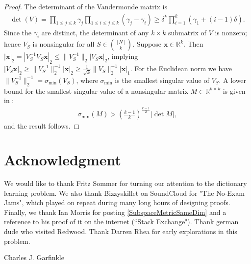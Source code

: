 \documentclass[journal, onecolumn]{IEEEtran}
\begin{document}
\begin{proof} 
The determinant of the Vandermonde matrix is
\begin{align}
	\det(V) = \prod_{1 \leq j \leq k} \gamma_j \prod_{1 \leq i \leq j \leq k} (\gamma_j - \gamma_i) \geq \delta^k \prod_{i = 1}^k (\gamma_1 + (i-1)\delta).
\end{align}	
Since the $\gamma_i$ are distinct, the determinant of any $k \times k$ submatrix of $V$ is nonzero; hence $V_S$ is nonsingular for all $S \in {[N] \choose k}$. Suppose $\mathbf{x} \in \mathbb{R}^k$. Then $|\mathbf{x}|_2 = |V_S^{-1} V_S \mathbf{x}|_2 \leq \|V_S^{-1}\|_2 |V_S \mathbf{x}|_2$, implying $|V_S \mathbf{x}|_2 \geq \|V_S^{-1}\|_2^{-1}|\mathbf{x}|_2 \geq \frac{1}{\sqrt{k}} \|V_S\|_2^{-1}|\mathbf{x}|_1$. For the Euclidean norm we have $\|V_S^{-1}\|_2^{-1} = \sigma_{\min}(V_S)$, where $\sigma_{\min}$ is the smallest singular value of $V_S$. A lower bound for the smallest singular value of a nonsingular matrix $M \in \mathbb{R}^{k \times k}$ is given in \cite{hong1992lower}:
\begin{align}
	\sigma_{\min}(M) > \left( \frac{k-1}{k} \right)^\frac{k-1}{2} |\det M|,
\end{align}
%
and the result follows. 
\end{proof}


\section*{Acknowledgment}
We would like to thank Fritz Sommer for turning our attention to the dictionary learning problem. We also thank Bizzyskillet on SoundCloud for "The No-Exam Jams", which played on repeat during many long hours of designing proofs. Finally, we thank Ian Morris for posting \eqref{SubspaceMetricSameDim} and a reference to his proof of it on the internet (``Stack Exchange").
Thank german dude who visited Redwood.  Thank Darren Rhea for early explorations in this problem.






\begin{IEEEbiographynophoto}{Charles J. Garfinkle}
\end{IEEEbiographynophoto}
\end{document}
